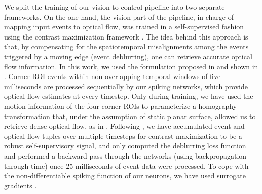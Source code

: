 We split the training of our vision-to-control pipeline into two separate frameworks. On the one hand, the vision part of the pipeline, in charge of mapping input events to optical flow, was trained in a self-supervised fashion using the contrast maximization framework \cite{gallego2018unifying,gallego2019focus}. The idea behind this approach is that, by compensating for the spatiotemporal misalignments among the events triggered by a moving edge (event deblurring), one can retrieve accurate optical flow information. In this work, we used the formulation proposed in \cite{hagenaars2021selfsupervised} and shown in . Corner ROI events within non-overlapping temporal windows of five milliseconds are processed sequentially by our spiking networks, which provide optical flow estimates at every timestep. Only during training, we have used the motion information of the four corner ROIs to parameterize a homography transformation that, under the assumption of static planar surface, allowed us to retrieve dense optical flow, as in \cite{baker2006parameterizing,detone2016deep,nguyen2018unsupervised,sanket2020evdodgenet}. Following \cite{hagenaars2021selfsupervised}, we have accumulated event and optical flow tuples over multiple timesteps for contrast maximization to be a robust self-supervisory signal, and only computed the deblurring loss function and performed a backward pass through the networks (using backpropagation through time) once 25 milliseconds of event data were processed. To cope with the non-differentiable spiking function of our neurons, we have used surrogate gradients \cite{neftci2019surrogate}.

